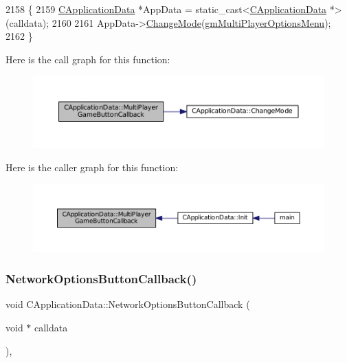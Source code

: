 \begin{DoxyCode}
2158                                                                   \{
2159     \hyperlink{classCApplicationData}{CApplicationData} *AppData = \textcolor{keyword}{static\_cast<}\hyperlink{classCApplicationData}{CApplicationData} *\textcolor{keyword}{>}(calldata);
2160     
2161     AppData->\hyperlink{classCApplicationData_aee18c113e9a0acb3cad3d63eb19de71b}{ChangeMode}(\hyperlink{classCApplicationData_ac8ac37a4c8bb871036fbbdc6a072e403a05987f29b3dd70c7223dd209c0f4ef8e}{gmMultiPlayerOptionsMenu});
2162 \}
\end{DoxyCode}
Here is the call graph for this function\+:\nopagebreak
\begin{figure}[H]
\begin{center}
\leavevmode
\includegraphics[width=350pt]{classCApplicationData_afabb120415cdadf67edca20c67e8c6fa_cgraph}
\end{center}
\end{figure}
Here is the caller graph for this function\+:\nopagebreak
\begin{figure}[H]
\begin{center}
\leavevmode
\includegraphics[width=350pt]{classCApplicationData_afabb120415cdadf67edca20c67e8c6fa_icgraph}
\end{center}
\end{figure}
\hypertarget{classCApplicationData_ad41dbc2f54ee638aa64a1d0c22b3fba9}{}\label{classCApplicationData_ad41dbc2f54ee638aa64a1d0c22b3fba9} 
\subsubsection{\texorpdfstring{Network\+Options\+Button\+Callback()}{NetworkOptionsButtonCallback()}}
{\footnotesize\ttfamily void C\+Application\+Data\+::\+Network\+Options\+Button\+Callback (\begin{DoxyParamCaption}\item[{void $\ast$}]{calldata }\end{DoxyParamCaption})\hspace{0.3cm}{\ttfamily [static]}, {\ttfamily [protected]}}



